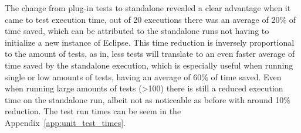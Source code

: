 The change from plug-in tests to standalone revealed a clear advantage when it came to test execution time, out of 20 executions there was an average of 20\% of time saved, which can be attributed to the standalone runs not having to initialize a new instance of Eclipse. This time reduction is inversely proportional to the amount of tests, as in, less tests will translate to an even faster average of time saved by the standalone execution, which is especially useful when running single or low amounts of tests, having an average of 60\% of time saved. Even when running large amounts of tests (>100) there is still a reduced execution time on the standalone run, albeit not as noticeable as before with around 10\% reduction. The test run times can be seem in the Appendix~\ref{app:unit_test_times}.













